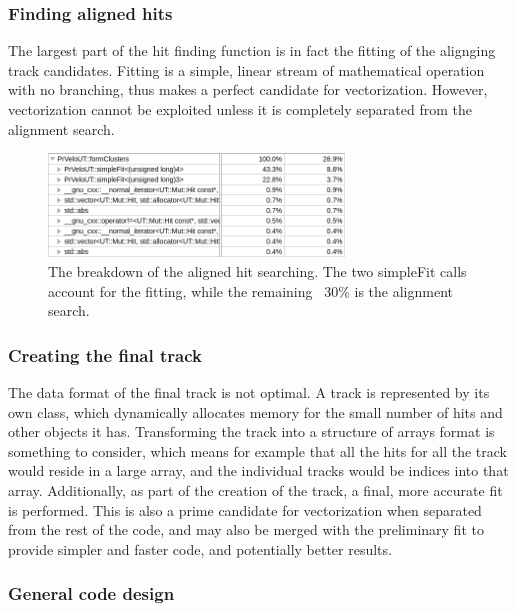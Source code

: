 \documentclass[12pt]{article}
\begin{document}
\subsubsection{Finding aligned hits}

The largest part of the hit finding function is in fact the fitting of the alignging track candidates. Fitting is a simple, linear stream of mathematical operation with no branching, thus makes a perfect candidate for vectorization. However, vectorization cannot be exploited unless it is completely separated from the alignment search.

\begin{figure}[H]
	\begin{center}
		\includegraphics[width=0.7\textwidth]{velout_hotspots_orig_formclusters}
	\end{center}
	\caption{The breakdown of the aligned hit searching. The two simpleFit calls account for the fitting, while the remaining ~30\% is the alignment search.}
	\label{fig_velout_hotspots_orig_formclusters}
\end{figure}


\subsubsection{Creating the final track}

The data format of the final track is not optimal. A track is represented by its own class, which dynamically allocates memory for the small number of hits and other objects it has. Transforming the track into a structure of arrays format is something to consider, which means for example that all the hits for all the track would reside in a large array, and the individual tracks would be indices into that array.
Additionally, as part of the creation of the track, a final, more accurate fit is performed. This is also a prime candidate for vectorization when separated from the rest of the code, and may also be merged with the preliminary fit to provide simpler and faster code, and potentially better results.


\subsubsection{General code design}
\end{document}
